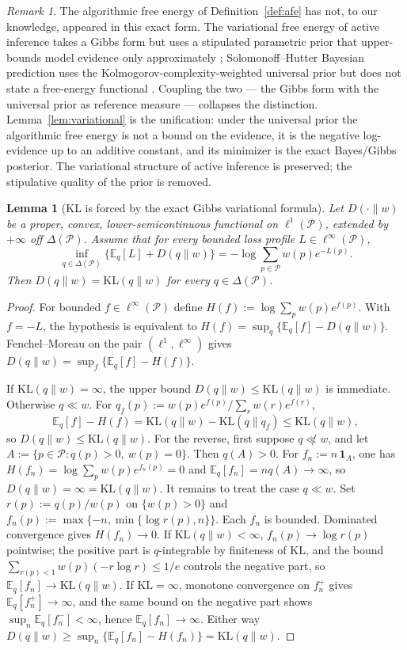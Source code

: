 \documentclass[11pt]{article}
\newtheorem{lemma}[theorem]{Lemma}
\theoremstyle{definition}
\theoremstyle{remark}
\newtheorem{remark}[theorem]{Remark}
\newcommand{\Pcal}{\mathcal{P}}
\newcommand{\E}{\mathbb{E}}
\newcommand{\KL}{\mathrm{KL}}
\newcommand{\one}{\mathbf{1}}
\begin{document}
\begin{remark}
\label{rem:afe-bayes-unification}
The algorithmic free energy of Definition~\ref{def:afe} has not, to our knowledge, appeared in this exact form. The variational free energy of active inference takes a Gibbs form but uses a stipulated parametric prior that upper-bounds model evidence only approximately \citep{Friston2010,ParrFriston2019}; Solomonoff--Hutter Bayesian prediction uses the Kolmogorov-complexity-weighted universal prior but does not state a free-energy functional \citep{Solomonoff1964a,Solomonoff1964b,Hutter2005}. Coupling the two --- the Gibbs form with the universal prior as reference measure --- collapses the distinction. Lemma~\ref{lem:variational} is the unification: under the universal prior the algorithmic free energy is not a bound on the evidence, it is the negative log-evidence up to an additive constant, and its minimizer is the exact Bayes/Gibbs posterior. The variational structure of active inference is preserved; the stipulative quality of the prior is removed.
\end{remark}

\begin{lemma}[KL is forced by the exact Gibbs variational formula]
\label{lem:kl-necessity}
Let $D(\cdot\|w)$ be a proper, convex, lower-semicontinuous functional on $\ell^1(\Pcal)$, extended by $+\infty$ off $\Delta(\Pcal)$. Assume that for every bounded loss profile $L\in\ell^\infty(\Pcal)$,
\[
\inf_{q\in\Delta(\Pcal)}\bigl\{\E_q[L]+D(q\|w)\bigr\}
=
-\log\sum_{p\in\Pcal} w(p)e^{-L(p)}.
\]
Then $D(q\|w)=\KL(q\|w)$ for every $q\in\Delta(\Pcal)$.
\end{lemma}

\begin{proof}
For bounded $f\in\ell^\infty(\Pcal)$ define $H(f):=\log\sum_p w(p)e^{f(p)}$. With $f=-L$, the hypothesis is equivalent to $H(f)=\sup_q\{\E_q[f]-D(q\|w)\}$. Fenchel--Moreau on the pair $(\ell^1,\ell^\infty)$ gives $D(q\|w)=\sup_f\{\E_q[f]-H(f)\}$.

If $\KL(q\|w)=\infty$, the upper bound $D(q\|w)\le \KL(q\|w)$ is immediate. Otherwise $q\ll w$. For $q_f(p):=w(p)e^{f(p)}/\sum_r w(r)e^{f(r)}$,
\[
\E_q[f]-H(f)=\KL(q\|w)-\KL(q\|q_f)\le \KL(q\|w),
\]
so $D(q\|w)\le\KL(q\|w)$. For the reverse, first suppose $q\not\ll w$, and let $A:=\{p\in\Pcal:q(p)>0,\ w(p)=0\}$. Then $q(A)>0$. For $f_n:=n\,\one_A$, one has $H(f_n)=\log\sum_p w(p)e^{f_n(p)}=0$ and $\E_q[f_n]=nq(A)\to\infty$, so $D(q\|w)=\infty=\KL(q\|w)$. It remains to treat the case $q\ll w$. Set $r(p):=q(p)/w(p)$ on $\{w(p)>0\}$ and $f_n(p):=\max\{-n,\min\{\log r(p),n\}\}$. Each $f_n$ is bounded. Dominated convergence gives $H(f_n)\to 0$. If $\KL(q\|w)<\infty$, $f_n(p)\to\log r(p)$ pointwise; the positive part is $q$-integrable by finiteness of $\KL$, and the bound $\sum_{r(p)<1}w(p)(-r\log r)\le 1/e$ controls the negative part, so $\E_q[f_n]\to\KL(q\|w)$. If $\KL=\infty$, monotone convergence on $f_n^+$ gives $\E_q[f_n^+]\to\infty$, and the same bound on the negative part shows $\sup_n\E_q[f_n^-]<\infty$, hence $\E_q[f_n]\to\infty$. Either way $D(q\|w)\ge\sup_n\{\E_q[f_n]-H(f_n)\}=\KL(q\|w)$.
\end{proof}
\end{document}
